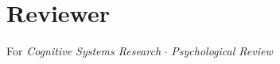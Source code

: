 \documentclass[letterpaper,11pt,oneside]{article}
\begin{document}
\noindent
\section*{\textcolor{gunmetal}{Reviewer}}

  \begin{hangparas}{0.25in}{1}
    For \emph{Cognitive Systems Research} $\cdot$ \emph{Psychological Review} 
  \end{hangparas}



\end{document}
